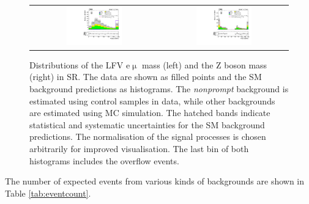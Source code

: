 \begin{figure}[tbh!]
 \begin{center}
 \begin{tabular}{cc}
  \includegraphics[width=0.45\textwidth]{figures/Part3/Nonprompt/SR/Memu}&
 \includegraphics[width=0.45\textwidth]{figures/Part3/Nonprompt/SR/Zmass} \\
 \end{tabular}
 \caption{Distributions of the LFV e$\upmu$ mass (left) and the Z boson mass (right) in \ac{SR}. The data are shown as filled points and the \ac{SM} background predictions as histograms. The \emph{nonprompt} background is estimated using control samples in data, while other backgrounds are estimated using \ac{MC} simulation. The hatched bands indicate statistical and systematic uncertainties for the \ac{SM} background predictions. The normalisation of the signal processes is chosen arbitrarily for improved visualisation. The last bin of both histograms includes the overflow events.}
 \label{fig:SR_DataDriven_1}
 \end{center}
\end{figure}

The number of expected events from various kinds of backgrounds are shown in Table \ref{tab:eventcount}. 

